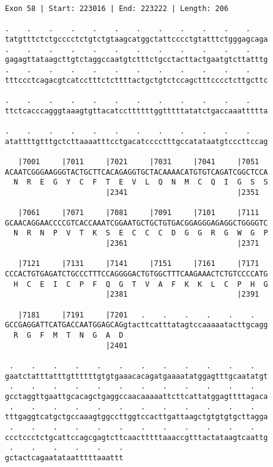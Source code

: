 \documentclass{article}
\begin{document}
\begin{Verbatim}
Exon 58 | Start: 223016 | End: 223222 | Length: 206
 
.    .    .    .    .    .    .    .    .    .    .    .    
tatgtttctctgcccctctgtctgtaagcatggctattcccctgtatttctgggagcaga
.    .    .    .    .    .    .    .    .    .    .    .    
gagagttataagcttgtctaggccaatgtctttctgcctacttactgaatgtcttatttg
.    .    .    .    .    .    .    .    .    .    .    .    
tttccctcagacgtcatcctttctcttttactgctgtctccagctttcccctcttgcttc
  
.    .    .    .    .    .    .    .    .    .    .    .    
ttctcacccagggtaaagtgttacatccttttttggtttttatatctgaccaaattttta
  
.    .    .    .    .    .    .    .    .    .    .    .    
atattttgtttgctcttaaaatttcctgacatcccctttgccatataatgtcccttccag
  
   |7001     |7011     |7021     |7031     |7041     |7051  
ACAATCGGGAAGGGTACTGCTTCACAGAGGTGCTACAAAACATGTGTCAGATCGGCTCCA
  N  R  E  G  Y  C  F  T  E  V  L  Q  N  M  C  Q  I  G  S  S
                       |2341                         |2351  
  
   |7061     |7071     |7081     |7091     |7101     |7111  
GCAACAGGAACCCCGTCACCAAATCGGAATGCTGCTGTGACGGAGGGAGAGGCTGGGGTC
  N  R  N  P  V  T  K  S  E  C  C  C  D  G  G  R  G  W  G  P
                       |2361                         |2371  
  
   |7121     |7131     |7141     |7151     |7161     |7171  
CCCACTGTGAGATCTGCCCTTTCCAGGGGACTGTGGCTTTCAAGAAACTCTGTCCCCATG
  H  C  E  I  C  P  F  Q  G  T  V  A  F  K  K  L  C  P  H  G
                       |2381                         |2391  
  
   |7181     |7191     |7201   .    .    .    .    .    .   
GCCGAGGATTCATGACCAATGGAGCAGgtacttcatttatagtccaaaaatacttgcagg
  R  G  F  M  T  N  G  A  D                                 
                       |2401                                
  
 .    .    .    .    .    .    .    .    .    .    .    .   
gaatctatttatttgttttttgtgtgaaacacagatgaaaatatggagtttgcaatatgt
 .    .    .    .    .    .    .    .    .    .    .    .   
gcctaggttgaattgcacagctgaggccaacaaaaattcttcattatggagttttagaca
 .    .    .    .    .    .    .    .    .    .    .    .   
tttgaggtcatgctgccaaagtggccttggtccacttgattaagctgtgtgtgcttagga
 .    .    .    .    .    .    .    .    .    .    .    .   
ccctccctctgcattccagcgagtcttcaactttttaaaccgtttactataagtcaattg
 .    .    .    .    .    .
gctactcagaatataatttttaaattt
\end{Verbatim}
\end{document}
